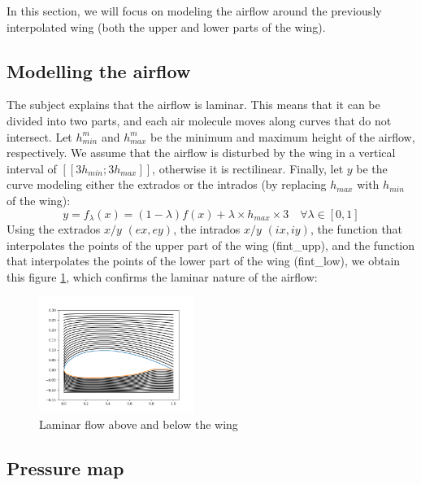 In this section, we will focus on modeling the airflow around the previously interpolated wing (both the upper and lower parts of the wing).
\subsection{Modelling the airflow}
The subject explains that the airflow is laminar. This means that it can be divided into two parts, and each air molecule moves along curves that do not intersect. Let $h_{min}^{m}$ and $h_{max}^{m}$ be the minimum and maximum height of the airflow, respectively. We assume that the airflow is disturbed by the wing in a vertical interval of $[[3h_{min}; 3h_{max}]]$, otherwise it is rectilinear. Finally, let $y$ be the curve modeling either the extrados or the intrados (by replacing $h_{max}$ with $h_{min}$ of the wing):
\begin{equation}
    \label{eq:equation_part3.1}
    y = f_{\lambda}(x) = (1 - \lambda)f(x) + \lambda \times h_{max} \times 3 \quad \forall \lambda \in [0,1] 
\end{equation}
Using the extrados $x/y$ $(ex, ey)$, the intrados $x/y$ $(ix, iy)$, the function that interpolates the points of the upper part of the wing (fint\_upp), and the function that interpolates the points of the lower part of the wing (fint\_low), we obtain this figure \ref{fig:laminar}, which confirms the laminar nature of the airflow:
\begin{figure}[h]
  \centering
  \includegraphics[width=0.45\textwidth]{img/laminar_flow.png}
  \caption{Laminar flow above and below the wing}
  \label{fig:laminar}
\end{figure}

\subsection{Pressure map}

